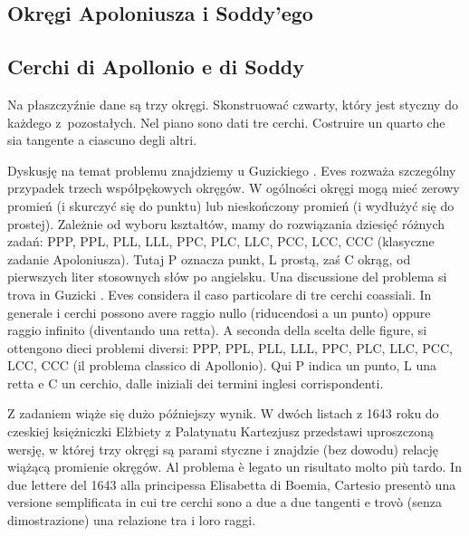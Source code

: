 
%

\subsection{Okręgi Apoloniusza i Soddy'ego} %
\subsection{Cerchi di Apollonio e di Soddy} %

\begin{problem}
    \label{problem_apoloniusza}%
    Na płaszczyźnie dane są trzy okręgi. %
    Skonstruować czwarty, który jest styczny do każdego z~pozostałych. %
    Nel piano sono dati tre cerchi. %
    Costruire un quarto che sia tangente a ciascuno degli altri. %
\end{problem}

Dyskusję na temat problemu znajdziemy u Guzickiego \cite[s. 444-461]{guzicki_2021}. %
Eves \cite[s. 164]{eves1_1972} rozważa szczególny przypadek trzech współpękowych okręgów. %
W ogólności okręgi mogą mieć zerowy promień (i skurczyć się do punktu) lub nieskończony promień (i wydłużyć się do prostej). %
Zależnie od wyboru kształtów, mamy do rozwiązania dziesięć różnych zadań: PPP, PPL, PLL, LLL, PPC, PLC, LLC, PCC, LCC, CCC (klasyczne zadanie Apoloniusza). %
Tutaj P oznacza punkt, L prostą, zaś C okrąg, od pierwszych liter stosownych słów po angielsku.%
Una discussione del problema si trova in Guzicki \cite[s. 444-461]{guzicki_2021}. %
Eves \cite[s. 164]{eves1_1972} considera il caso particolare di tre cerchi coassiali. %
In generale i cerchi possono avere raggio nullo (riducendosi a un punto) oppure raggio infinito (diventando una retta). %
A seconda della scelta delle figure, si ottengono dieci problemi diversi: PPP, PPL, PLL, LLL, PPC, PLC, LLC, PCC, LCC, CCC (il problema classico di Apollonio). %
Qui P indica un punto, L una retta e C un cerchio, dalle iniziali dei termini inglesi corrispondenti.%

Z zadaniem wiąże się dużo późniejszy wynik. %
W dwóch listach z 1643 roku do czeskiej księżniczki Elżbiety z Palatynatu Kartezjusz przedstawi uproszczoną wersję, w której trzy okręgi są parami styczne i znajdzie (bez dowodu) relację wiążącą promienie okręgów.%
Al problema è legato un risultato molto più tardo. %
In due lettere del 1643 alla principessa Elisabetta di Boemia, Cartesio presentò una versione semplificata in cui tre cerchi sono a due a due tangenti e trovò (senza dimostrazione) una relazione tra i loro raggi.%

